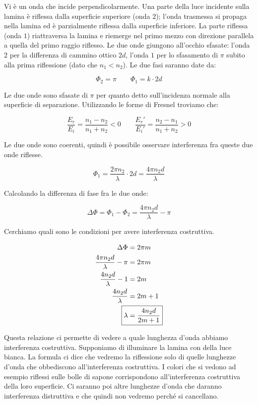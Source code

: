 Vi è un onda che incide perpendicolarmente. Una parte della luce incidente sulla lamina è riflessa dalla superficie superiore (onda $2$); l'onda trasmessa si propaga nella lamina ed è parzialmente riflessa dalla superficie inferiore. La parte riflessa (onda $1$) riattraversa la lamina e riemerge nel primo mezzo con direzione parallela a quella del primo raggio riflesso. Le due onde giungono all'occhio sfasate: l'onda $2$ per la differenza di cammino ottico $2d$, l'onda $1$ per lo sfasamento di $\pi$ subito alla prima riflessione (dato che $n_1<n_2$). Le due fasi saranno date da:

\[
	\Phi_2 = \pi \qquad \Phi_1 = k\cdot 2d
\]

Le due onde sono sfasate di $\pi$ per quanto detto sull'incidenza normale alla superficie di separazione.
Utilizzando le forme di Fresnel troviamo che:

\[
	\frac{E_r}{E_i} = \frac{n_1-n_2}{n_1+n_2}<0 \qquad \frac{E_r'}{E_i'} = \frac{n_2-n_1}{n_1+n_2}>0
\]

Le due onde sono coerenti, quindi è possibile osservare interferenza fra queste due onde riflesse.

\[
	\Phi_1 = \frac{2\pi n_2}{\lambda}\cdot 2d=\frac{4\pi n_2d}{\lambda}
\]

Calcolando la differenza di fase fra le due onde:

\[
	\Delta \Phi =\Phi_1-\Phi_2 =\frac{4\pi n_2d}{\lambda}  - \pi
\]

Cerchiamo quali sono le condizioni per avere interferenza costruttiva.

\begin{align*}
	\Delta \Phi &= 2\pi m\\
	\frac{4\pi n_2d}{\lambda}  - \pi  &= 2\pi m\\
	\frac{4 n_2d}{\lambda}  - 1  &= 2 m\\
	\frac{4n_2d}{\lambda} &= 2m+1 \\
	\Aboxed{\lambda &= \frac{4n_2d}{2m+1}}
\end{align*}

Questa relazione ci permette di vedere a quale lunghezza d'onda abbiamo interferenza costruttiva. Supponiamo di illuminare la lamina con della luce bianca. La formula ci dice che vedremo la riflessione solo di quelle lunghezze d'onda che obbediscono all'interferenza costruttiva. I colori che si vedono ad esempio riflessi sulle bolle di sapone corrispondono all'interferenza costruttiva della loro superficie. Ci saranno poi altre lunghezze d'onda che daranno interferenza distruttiva e che quindi non vedremo perché si cancellano.

